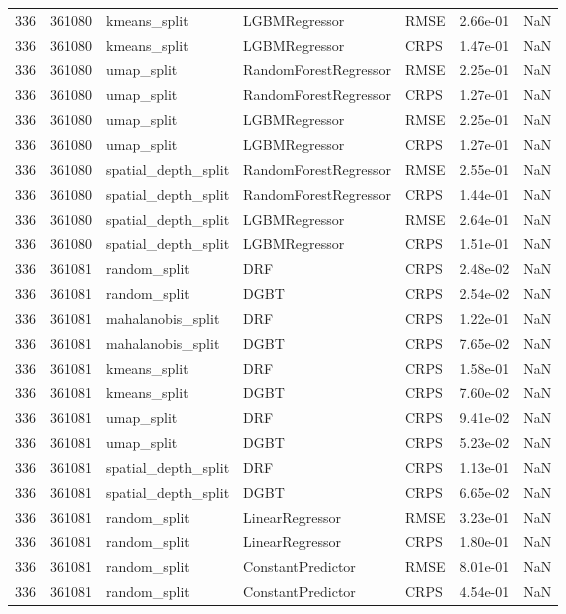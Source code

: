 \begin{tabular}{rrlllrr}
336 & 361080 & kmeans\_split & LGBMRegressor & RMSE & 2.66e-01 & NaN \\
336 & 361080 & kmeans\_split & LGBMRegressor & CRPS & 1.47e-01 & NaN \\
336 & 361080 & umap\_split & RandomForestRegressor & RMSE & 2.25e-01 & NaN \\
336 & 361080 & umap\_split & RandomForestRegressor & CRPS & 1.27e-01 & NaN \\
336 & 361080 & umap\_split & LGBMRegressor & RMSE & 2.25e-01 & NaN \\
336 & 361080 & umap\_split & LGBMRegressor & CRPS & 1.27e-01 & NaN \\
336 & 361080 & spatial\_depth\_split & RandomForestRegressor & RMSE & 2.55e-01 & NaN \\
336 & 361080 & spatial\_depth\_split & RandomForestRegressor & CRPS & 1.44e-01 & NaN \\
336 & 361080 & spatial\_depth\_split & LGBMRegressor & RMSE & 2.64e-01 & NaN \\
336 & 361080 & spatial\_depth\_split & LGBMRegressor & CRPS & 1.51e-01 & NaN \\
336 & 361081 & random\_split & DRF & CRPS & 2.48e-02 & NaN \\
336 & 361081 & random\_split & DGBT & CRPS & 2.54e-02 & NaN \\
336 & 361081 & mahalanobis\_split & DRF & CRPS & 1.22e-01 & NaN \\
336 & 361081 & mahalanobis\_split & DGBT & CRPS & 7.65e-02 & NaN \\
336 & 361081 & kmeans\_split & DRF & CRPS & 1.58e-01 & NaN \\
336 & 361081 & kmeans\_split & DGBT & CRPS & 7.60e-02 & NaN \\
336 & 361081 & umap\_split & DRF & CRPS & 9.41e-02 & NaN \\
336 & 361081 & umap\_split & DGBT & CRPS & 5.23e-02 & NaN \\
336 & 361081 & spatial\_depth\_split & DRF & CRPS & 1.13e-01 & NaN \\
336 & 361081 & spatial\_depth\_split & DGBT & CRPS & 6.65e-02 & NaN \\
336 & 361081 & random\_split & LinearRegressor & RMSE & 3.23e-01 & NaN \\
336 & 361081 & random\_split & LinearRegressor & CRPS & 1.80e-01 & NaN \\
336 & 361081 & random\_split & ConstantPredictor & RMSE & 8.01e-01 & NaN \\
336 & 361081 & random\_split & ConstantPredictor & CRPS & 4.54e-01 & NaN \\

\end{tabular}
